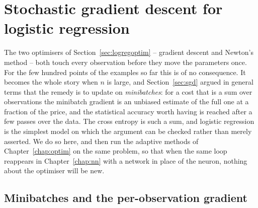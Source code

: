 \section{Stochastic gradient descent for logistic regression}
\label{sec:logregsgd}

The two optimisers of Section~\ref{sec:logregoptim} -- gradient descent and
Newton's method -- both touch every observation before they move the
parameters once.  For the few hundred points of the examples so far this is
of no consequence.  It becomes the whole story when $n$ is large, and
Section~\ref{sec:sgd} argued in general terms that the remedy is to update
on \emph{minibatches}: for a cost that is a sum over observations the
minibatch gradient is an unbiased estimate of the full one at a fraction of
the price, and the statistical accuracy worth having is reached after a few
passes over the data.  The cross entropy is such a sum, and logistic
regression is the simplest model on which the argument can be checked
rather than merely asserted.  We do so here, and then run the adaptive
methods of Chapter~\ref{chap:optim} on the same problem, so that when the
same loop reappears in Chapter~\ref{chap:nn} with a network in place of the
neuron, nothing about the optimiser will be new.

\subsection{Minibatches and the per-observation gradient}
\label{sec:logregminibatch}

